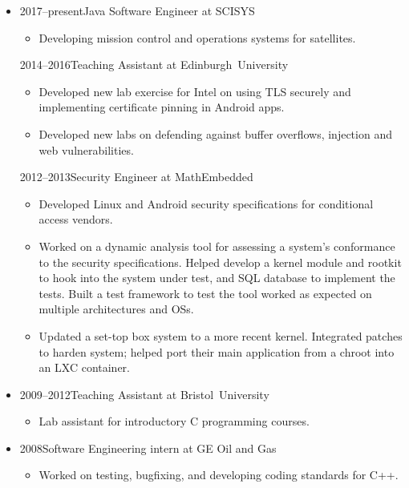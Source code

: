 \documentclass[a4paper,10pt,selectp]{book}
\newcommand{\lowercaps}[1]{\textsc{\MakeLowercase{#1}}}
\newcommand{\sideheading}[1]{\vspace{0.5em}\marginnote[\color{BrickRed}\raggedleft\lowercaps{#1}]{\raggedleft\lowercaps{#1}}}
\newcommand{\listhead}[1]{#1}
\begin{document}
\begin{itemize}
\item[] 
  \sideheading{Experience}%
  \listhead{2017--present\hspace{1em}Java Software Engineer at SCISYS}
  \begin{itemize}
  \item[\textbullet] Developing mission control and operations systems for satellites.
  \end{itemize}
  \listhead{2014--2016\hspace{1em}Teaching Assistant at Edinburgh~University}
  \begin{itemize}
  \item[\textbullet] Developed new lab exercise for Intel on using TLS securely and implementing certificate pinning in Android apps.
  \item[\textbullet] Developed new labs on defending against buffer overflows, injection and web vulnerabilities.
  \end{itemize}
  \listhead{2012–2013\hspace{1em}Security Engineer at MathEmbedded}
  \begin{itemize}
  \item[\textbullet] Developed Linux and Android security specifications for conditional access vendors.  
  \item[\textbullet] Worked on a dynamic analysis tool for assessing a system's
    conformance to the security specifications.  Helped develop a
    kernel module and rootkit to hook into the system under test, and
    SQL database to implement the tests.  Built a test framework to test the tool worked as expected on multiple architectures and OSs.
  \item[\textbullet] Updated a set-top box system to a more recent kernel. Integrated patches to
    harden system; helped port their main application from a chroot into an LXC container.
  \end{itemize}

\item[] \listhead{2009–2012\hspace{1em}Teaching Assistant at Bristol~University}
    \begin{itemize}
    \item[\textbullet] Lab assistant for introductory C programming courses.
    \end{itemize}

\item[] \listhead{2008\hspace{1em}Software Engineering intern at GE Oil and Gas}
  \begin{itemize}
    \item[\textbullet] Worked on testing, bugfixing, and developing coding standards for C++.
  \end{itemize}


\end{itemize}
\end{document}
